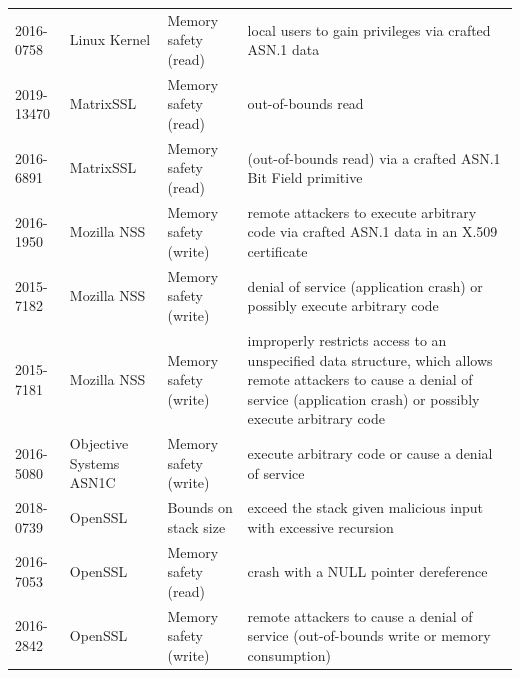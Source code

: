 \documentclass[10p,conference]{IEEEtran}
\begin{document}
\begin{longtable}{ l l l p{25em} }
2016-0758    & Linux Kernel  & Memory safety (read) & local users to gain privileges via crafted ASN.1 data \\ 
2019-13470   & MatrixSSL     & Memory safety (read) & out-of-bounds read \\ 
2016-6891    & MatrixSSL     & Memory safety (read) & (out-of-bounds read) via a crafted ASN.1 Bit Field primitive \\ 
2016-1950    & Mozilla NSS   & Memory safety (write) & remote attackers to execute arbitrary code via crafted ASN.1 data in an X.509 certificate \\ 
2015-7182    & Mozilla NSS   & Memory safety (write) & denial of service (application crash) or possibly execute arbitrary code \\ 
2015-7181    & Mozilla NSS   & Memory safety (write) & improperly restricts access to an unspecified data structure, which allows remote attackers to cause a denial of service (application crash) or possibly execute arbitrary code \\ 
2016-5080    & Objective Systems ASN1C & Memory safety (write) & execute arbitrary code or cause a denial of service \\ 
2018-0739    & OpenSSL       & Bounds on stack size & exceed the stack given malicious input with excessive recursion \\ 
2016-7053    & OpenSSL       & Memory safety (read) & crash with a NULL pointer dereference \\ 
2016-2842    & OpenSSL       & Memory safety (write) & remote attackers to cause a denial of service (out-of-bounds write or memory consumption) \\ 
 

\end{longtable}
\end{document}
